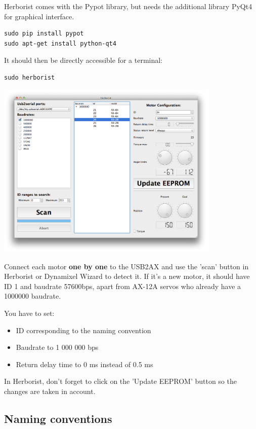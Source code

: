 \documentclass[includefoot]{article}
\begin{document}
Herborist comes with the Pypot library, but needs the additional library PyQt4 for graphical interface.
\begin{verbatim}
sudo pip install pypot
sudo apt-get install python-qt4
\end{verbatim}

It should then be directly accessible for a terminal:
\begin{verbatim}
sudo herborist
\end{verbatim}
 \begin{center}
  \includegraphics[width=0.8\textwidth]{img/herborist}
 \end{center}
 
 Connect each motor \textbf{one by one} to the USB2AX and use the 'scan' button in Herborist or Dynamixel Wizard to detect it. If it's a new motor, it should have ID 1 and baudrate 57600bps, apart from AX-12A servos who already have a 1000000 baudrate.

You have to set:
\begin{itemize}
\item ID corresponding to the naming convention
\item Baudrate to 1 000 000 bps
\item Return delay time to 0 ms instead of 0.5 ms
\end{itemize}

In Herborist, don't forget to click on the 'Update EEPROM' button so the changes are taken in account.


\subsection{Naming conventions}
\end{document}
